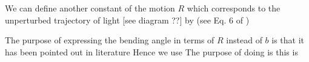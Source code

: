 We can define another constant of the motion $R$ which corresponds to the unperturbed trajectory of light [see diagram ??] by (see Eq. 6 of \citet{ishak2008new})

  

The purpose of expressing the bending angle in terms of $R$ instead of $b$ is that it has been pointed out in literature 
Hence we use 
The purpose of doing is this is 